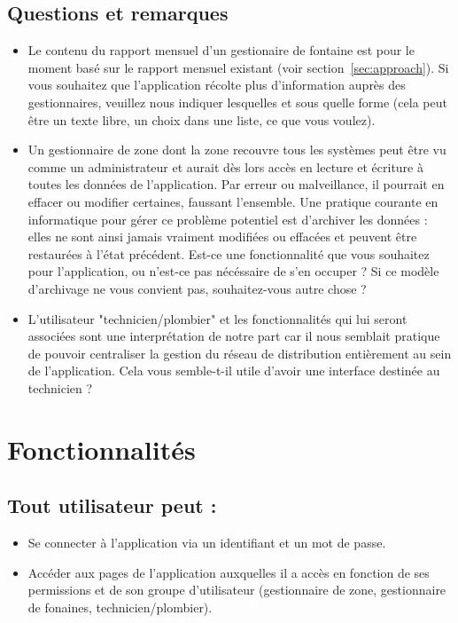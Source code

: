\documentclass[a4paper, 11pt]{article}
\begin{document}
  \subsection{Questions et remarques}
  \begin{itemize}
    \item Le contenu du rapport mensuel d'un gestionaire de fontaine est pour le moment basé sur le rapport mensuel existant (voir section~\ref{sec:approach}). Si vous souhaitez que l'application récolte plus d'information auprès des gestionnaires, veuillez nous indiquer lesquelles et sous quelle forme (cela peut être un texte libre, un choix dans une liste, ce que vous voulez).
    \item Un gestionnaire de zone dont la zone recouvre tous les systèmes peut être vu comme un administrateur et aurait dès lors accès en lecture et écriture à toutes les données de l'application. Par erreur ou malveillance, il pourrait en effacer ou modifier certaines, faussant l'ensemble. Une pratique courante en informatique pour gérer ce problème potentiel est d'archiver les données : elles ne sont ainsi jamais vraiment modifiées ou effacées et peuvent être restaurées à l'état précédent. Est-ce une fonctionnalité que vous souhaitez pour l'application, ou n'est-ce pas nécéssaire de s'en occuper ? Si ce modèle d'archivage ne vous convient pas, souhaitez-vous autre chose ?
    \item L'utilisateur "technicien/plombier" et les fonctionnalités qui lui seront associées sont une interprétation de notre part car il nous semblait pratique de pouvoir centraliser la gestion du réseau de distribution entièrement au sein de l'application. Cela vous semble-t-il utile d'avoir une interface destinée au technicien ?
  \end{itemize}

\section{Fonctionnalités}

\subsection{Tout utilisateur peut :}
\begin{itemize}
  \item Se connecter à l'application via un identifiant et un mot de passe.
  \item Accéder aux pages de l'application auxquelles il a accès en fonction de ses permissions et de son groupe d'utilisateur (gestionnaire de zone, gestionnaire de fonaines, technicien/plombier).
\end{itemize}
\end{document}
